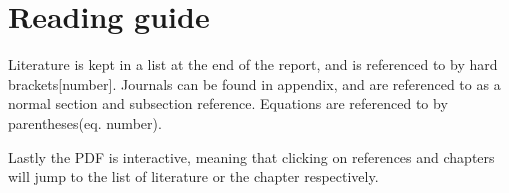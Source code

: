 \documentclass[../../main]{subfiles}
\begin{document}
\section{Reading guide}
\label{sec:reading_guide}
Literature is kept in a list at the end of the report, and is referenced to by hard brackets[number].
Journals can be found in appendix, and are referenced to as a normal section and subsection reference.
Equations are referenced to by parentheses(eq. number).

Lastly the PDF is interactive, meaning that clicking on references and chapters will jump to the list of literature or the chapter respectively.
\end{document}
